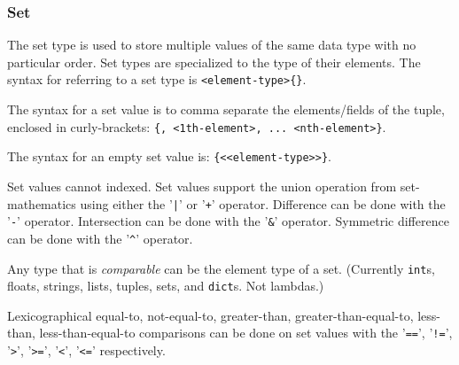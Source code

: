 
\subsubsection{Set}
{
	The set type is used to store
	multiple values of the same data type with no
	particular order.
	Set types are specialized to the type of their elements.
	The syntax for referring to a set type
	is \texttt{<element-type>\{\}}.
	
	The syntax for a set value is to comma separate the elements/fields
	of the tuple, enclosed in
	curly-brackets: \texttt{\{<0th-element>, <1th-element>, ... <nth-element>\}}.
	
	The syntax for an empty set value is: \texttt{\{<<element-type>>\}}.
	
	Set values cannot indexed.
	Set values support the union operation from set-mathematics using
	either the '\texttt{|}' or '\texttt{+}' operator.
	Difference can be done with the '\texttt{-}' operator.
	Intersection can be done with the '\texttt{\&}' operator.
	Symmetric difference can be done with the '\texttt{\^}' operator.
	
	Any type that is \textit{comparable} can be the element type of a set.
	(Currently \texttt{int}s, floats, strings, lists, tuples,
		sets, and \texttt{dict}s. Not lambdas.)
	
	Lexicographical equal-to, not-equal-to, greater-than, greater-than-equal-to,
	less-than, less-than-equal-to comparisons can be done on set values with
	the '\texttt{==}', '\texttt{!=}',
	'\texttt{>}', '\texttt{>=}', '\texttt{<}', '\texttt{<=}' respectively.
	
}
